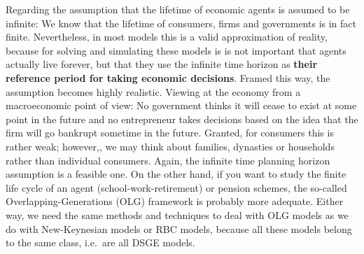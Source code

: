 \begin{enumerate}
Regarding the assumption that the lifetime of economic agents is assumed to be infinite:
We know that the lifetime of consumers, firms and governments is in fact finite.
Nevertheless, in most models this is a valid approximation of reality,
  because for solving and simulating these models is is not important that agents actually live forever,
  but that they use the infinite time horizon as \textbf{their reference period for taking economic decisions}.
Framed this way, the assumption becomes highly realistic.
Viewing at the economy from a macroeconomic point of view:
No government thinks it will cease to exist at some point in the future and
  no entrepreneur takes decisions based on the idea that the firm will go bankrupt sometime in the future.
Granted, for consumers this is rather weak; however,, we may think about families, dynasties or households rather than individual consumers.
Again, the infinite time planning horizon assumption is a feasible one.
On the other hand, if you want to study the finite life cycle of an agent (school-work-retirement) or pension schemes,
  the so-called Overlapping-Generations (OLG) framework is probably more adequate.
Either way, we need the same methods and techniques to deal with OLG models as we do with New-Keynesian models or RBC models,
  because all these models belong to the same class, i.e.\ are all DSGE models.
\end{enumerate}